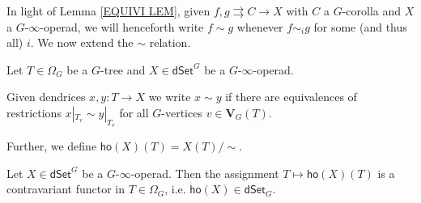 \documentclass[a4paper,10pt
,draft
]{article}%
\renewcommand{\1}{\eta}%
\begin{document}
In light of Lemma \ref{EQUIVI LEM},
given $f,g \rightrightarrows C \to X$ with 
$C$ a $G$-corolla and $X$ a $G$-$\infty$-operad,
we will henceforth write $f \sim g$ whenever $f \sim_i g$ for some (and thus all) $i$.
We now extend the $\sim$ relation.

\begin{definition}\label{XTENDSIM DEF}
	Let $T \in \Omega_G$ be a $G$-tree
	and $X \in \mathsf{dSet}^G$ be a 
	$G$-$\infty$-operad.
	
	Given dendrices $x,y\colon T \to X$ we write
	$x \sim y$ if there are equivalences of restrictions
	$x|_{T_v} \sim y|_{T_v}$ for all $G$-vertices
	$v \in \boldsymbol{V}_G(T)$.
	
	Further, we define $\mathsf{ho}(X)(T) = X(T)/\sim$.
\end{definition}

\begin{proposition}
Let $X \in \mathsf{dSet}^G$ be a $G$-$\infty$-operad. Then the assignment 
		$T \mapsto \mathsf{ho}(X)(T)$
		is a contravariant functor in $T \in \Omega_G$, i.e.
		$\mathsf{ho}(X)\in \mathsf{dSet}_G$.
\end{proposition}
\end{document}
